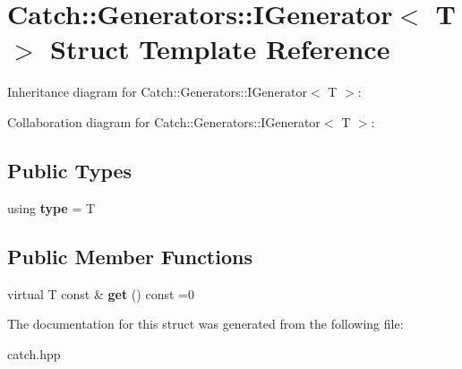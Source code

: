 \hypertarget{structCatch_1_1Generators_1_1IGenerator}{}\section{Catch\+:\+:Generators\+:\+:I\+Generator$<$ T $>$ Struct Template Reference}
\label{structCatch_1_1Generators_1_1IGenerator}


Inheritance diagram for Catch\+:\+:Generators\+:\+:I\+Generator$<$ T $>$\+:


Collaboration diagram for Catch\+:\+:Generators\+:\+:I\+Generator$<$ T $>$\+:
\subsection*{Public Types}
\begin{DoxyCompactItemize}
\item 
\mbox{\label{structCatch_1_1Generators_1_1IGenerator_a1f8677875fe0ff31f39c60d45504b9a5}} 
using {\bfseries type} = T
\end{DoxyCompactItemize}
\subsection*{Public Member Functions}
\begin{DoxyCompactItemize}
\item 
\mbox{\label{structCatch_1_1Generators_1_1IGenerator_a525d381fc9249a885b075a0632a8579a}} 
virtual T const  \& {\bfseries get} () const =0
\end{DoxyCompactItemize}


The documentation for this struct was generated from the following file\+:\begin{DoxyCompactItemize}
\item 
catch.\+hpp\end{DoxyCompactItemize}
